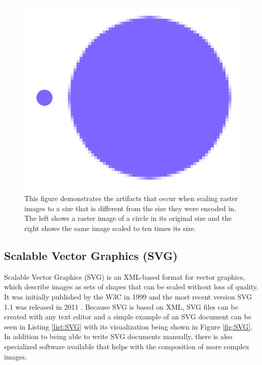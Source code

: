 \begin{figure}[tp]
    \centering
    \includegraphics[keepaspectratio,width=\linewidth,height=\fullh / 3]
    {images/raster-image.png}

    \caption[Raster Image Scaling Artifacts]{
        This figure demonstrates the artifacts that occur when scaling raster images to a size that is different from the size they were encoded in. The left shows a raster image of a circle in its original size and the right shows the same image scaled to ten times its size.
    }
    \label{fig:RasterImage}
\end{figure}

\subsection{Scalable Vector Graphics (SVG)}

Scalable Vector Graphics (SVG) is an XML-based format for vector graphics, which describe images as sets of shapes that can be scaled without loss of quality. It was initially published by the W3C in 1999 \parencite{SVG1.0} and the most recent version SVG 1.1 was released in 2011 \parencite{SVG1.1}. Because SVG is based on XML, SVG files can be created with any text editor and a simple example of an SVG document can be seen in Listing \ref{list:SVG} with its visualization being shown in Figure \ref{fig:SVG}. In addition to being able to write SVG documents manually, there is also specialized software available that helps with the composition of more complex images.

